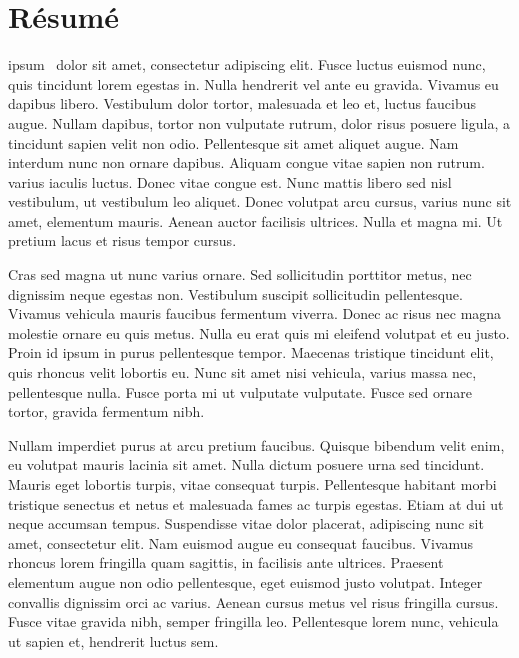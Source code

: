 \chapter*{Résumé}

 ipsum~\cite{Book1} dolor sit amet, consectetur
adipiscing elit. Fusce luctus euismod nunc, quis tincidunt lorem
egestas in. Nulla hendrerit vel ante eu gravida. Vivamus eu dapibus
libero. Vestibulum dolor tortor, malesuada et leo et, luctus faucibus
augue. Nullam dapibus, tortor non vulputate rutrum, dolor risus
posuere ligula, a tincidunt sapien velit non odio. Pellentesque sit
amet aliquet augue. Nam interdum nunc non ornare dapibus. Aliquam
congue vitae sapien non rutrum.  varius iaculis
luctus. Donec vitae congue est. Nunc mattis libero sed nisl
vestibulum, ut vestibulum leo aliquet. Donec volutpat arcu cursus,
varius nunc sit amet, elementum mauris. Aenean auctor facilisis
ultrices. Nulla et magna mi. Ut pretium lacus et risus tempor cursus.

 Cras sed magna ut nunc varius ornare. Sed sollicitudin porttitor
 metus, nec dignissim neque egestas non. Vestibulum suscipit
 sollicitudin pellentesque. Vivamus vehicula mauris faucibus fermentum
 viverra. Donec ac risus nec magna molestie ornare eu quis metus.
 Nulla eu erat quis mi eleifend volutpat et eu justo. Proin id ipsum
 in purus pellentesque tempor. Maecenas tristique tincidunt elit, quis
 rhoncus velit lobortis eu. Nunc sit amet nisi vehicula, varius massa
 nec, pellentesque nulla. Fusce porta mi ut vulputate vulputate. Fusce
 sed ornare tortor, gravida fermentum nibh.

Nullam imperdiet purus at arcu pretium faucibus. Quisque bibendum
velit enim, eu volutpat mauris lacinia sit amet. Nulla dictum posuere
urna sed tincidunt. Mauris eget lobortis turpis, vitae consequat
turpis. Pellentesque habitant morbi tristique senectus et netus et
malesuada fames ac turpis egestas. Etiam at dui ut neque accumsan
tempus. Suspendisse vitae dolor placerat, adipiscing nunc sit amet,
consectetur elit. Nam euismod augue eu consequat faucibus. Vivamus
rhoncus lorem fringilla quam sagittis, in facilisis ante ultrices.
Praesent elementum augue non odio pellentesque, eget euismod justo
volutpat. Integer convallis dignissim orci ac varius. Aenean cursus
metus vel risus fringilla cursus. Fusce vitae gravida nibh, semper
fringilla leo. Pellentesque lorem nunc, vehicula ut sapien et,
hendrerit luctus sem.
